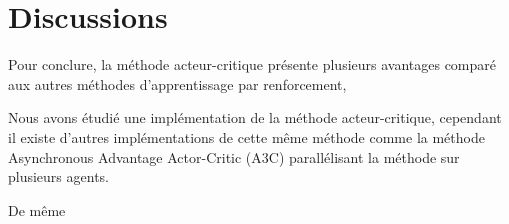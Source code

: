 \section{Discussions}

Pour conclure, la méthode acteur-critique présente plusieurs avantages comparé aux
autres méthodes d'apprentissage par renforcement,

Nous avons étudié une implémentation de la méthode acteur-critique, 
cependant il existe d'autres implémentations de cette même méthode comme la 
méthode Asynchronous Advantage Actor-Critic (A3C) parallélisant la méthode sur plusieurs agents. 

De même 


